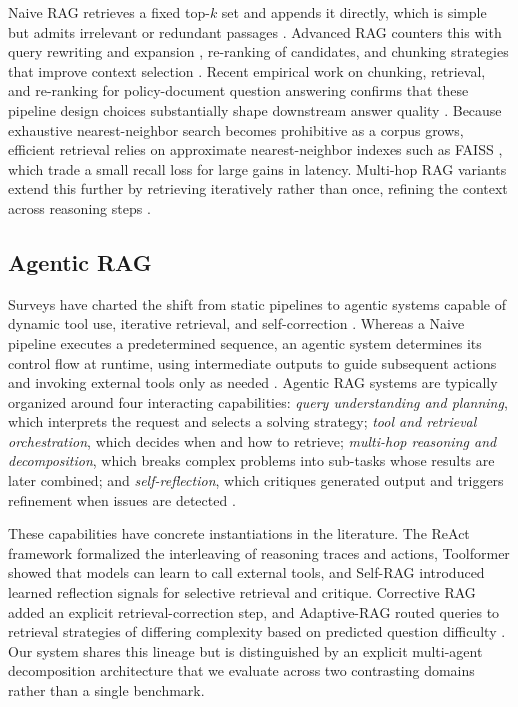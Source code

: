 \documentclass[conference]{IEEEtran}
\begin{document}
Naive RAG retrieves a fixed top-$k$ set and appends it directly, which is simple but admits irrelevant or redundant passages \cite{amorim2024empirical}. Advanced RAG counters this with query rewriting and expansion \cite{wang2023query2doc}, re-ranking of candidates, and chunking strategies that improve context selection \cite{gao2023survey}. Recent empirical work on chunking, retrieval, and re-ranking for policy-document question answering confirms that these pipeline design choices substantially shape downstream answer quality \cite{maharjan2026chunking}. Because exhaustive nearest-neighbor search becomes prohibitive as a corpus grows, efficient retrieval relies on approximate nearest-neighbor indexes such as FAISS \cite{johnson2019billion, douze2024faiss, ghadekar2023faiss}, which trade a small recall loss for large gains in latency. Multi-hop RAG variants extend this further by retrieving iteratively rather than once, refining the context across reasoning steps \cite{feldman2023multihop}.

\subsection{Agentic RAG}
Surveys have charted the shift from static pipelines to agentic systems capable of dynamic tool use, iterative retrieval, and self-correction \cite{ghadekar2025survey, wang2024evolution, mishra2026sok}. Whereas a Naive pipeline executes a predetermined sequence, an agentic system determines its control flow at runtime, using intermediate outputs to guide subsequent actions and invoking external tools only as needed \cite{wang2023agents}. Agentic RAG systems are typically organized around four interacting capabilities: \emph{query understanding and planning}, which interprets the request and selects a solving strategy; \emph{tool and retrieval orchestration}, which decides when and how to retrieve; \emph{multi-hop reasoning and decomposition}, which breaks complex problems into sub-tasks whose results are later combined; and \emph{self-reflection}, which critiques generated output and triggers refinement when issues are detected \cite{ng2024agentic, yan2024multiagent}.

These capabilities have concrete instantiations in the literature. The ReAct framework \cite{yao2022react} formalized the interleaving of reasoning traces and actions, Toolformer \cite{schick2023toolformer} showed that models can learn to call external tools, and Self-RAG \cite{asai2024selfrag} introduced learned reflection signals for selective retrieval and critique. Corrective RAG \cite{yan2024corrective} added an explicit retrieval-correction step, and Adaptive-RAG \cite{jeong2024adaptive} routed queries to retrieval strategies of differing complexity based on predicted question difficulty \cite{wandb2024agentic, hu2024selfcorrection}. Our system shares this lineage but is distinguished by an explicit multi-agent decomposition architecture that we evaluate across two contrasting domains rather than a single benchmark.
\end{document}
